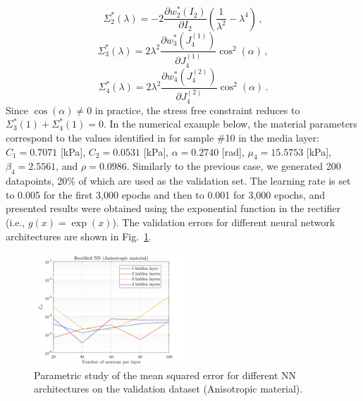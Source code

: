 \begin{equation}
    \Sigma^*_2(\lambda) = -2 \frac{\partial w_2^*(I_2)}{\partial I_2} \left(\frac{1}{\lambda^2} - \lambda^4 \right)\,,
\end{equation}
\begin{equation}
    \Sigma_3^*(\lambda) = 2 \lambda^2 \frac{\partial w_3^*(J_4^{(1)})}{\partial J_4^{(1)}} \cos^2(\alpha)\,,
\end{equation}
\begin{equation}\label{eq:aniso-last-stress-component}
    \Sigma_4^*(\lambda) = 2 \lambda^2 \frac{\partial w_4^*(J_4^{(2)})}{\partial J_4^{(2)}} \cos^2(\alpha)\,.
\end{equation}
Since $\cos(\alpha) \neq 0$ in practice, the stress free constraint reduces to $\Sigma^*_3(1) + \Sigma^*_4(1) = 0$.
In the numerical example below, the material parameters correspond to the values identified in \cite{CHEN2022114897} for sample \#10 in the media layer: $C_1 = 0.7071$ [kPa], $C_2 = 0.0531$ [kPa], $\alpha = 0.2740$ [rad], $\mu_4 = 15.5753$ [kPa], $\beta_4 = 2.5561$, and $\rho = 0.0986$. Similarly to the previous case, we generated 200 datapoints, 20\% of which are used as the validation set. The learning rate is set to 0.005 for the first 3,000 epochs and then to 0.001 for 3,000 epochs, and presented results were obtained using the exponential function in the rectifier (i.e., $g(x) = \exp(x)$). The validation errors for different neural network architectures are shown in Fig.~\ref{fig:ani_err}.
\begin{figure}[ht!]
    \begin{center}
    \includegraphics[width=0.5\textwidth]{Pictures/ANI_ERR.png}
    \end{center}
    \caption[Parametric study for different NN architectures.]{Parametric study of the mean squared error for different NN architectures on the validation dataset (Anisotropic material).}
    \label{fig:ani_err}
\end{figure}
